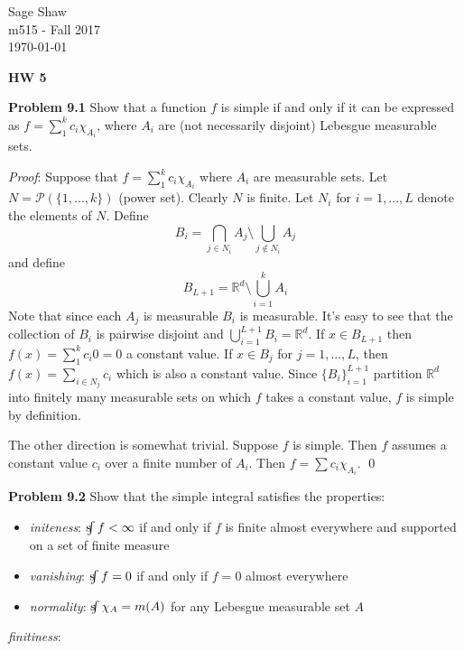 \documentclass[12pt]{article}
\newcommand{\problem}[1]{\hspace{-4 ex} \large \textbf{Problem #1} }
\newcommand{\sint}{\text{s}\kern-5pt\int}
\newcommand{\powerset}{\mathcal{P}}
\renewenvironment{proof}{\hspace{-4 ex} \emph{Proof}:}{\qed}
\begin{document}
	\thispagestyle{empty}
	
	\begin{flushright}
		Sage Shaw \\
		m515 - Fall 2017 \\
		\today
	\end{flushright}
	
{\large \textbf{HW 5}}\bigbreak

\problem{9.1} Show that a function $f$ is simple if and only if it can be expressed as $f=\sum_1^kc_i\chi_{A_i}$, where $A_i$ are (not necessarily disjoint) Lebesgue measurable sets.

	\begin{proof}
		Suppose that $f=\sum_1^kc_i\chi_{A_i}$ where $A_i$ are measurable sets.
		Let $N = \powerset (\{1,...,k\})$ (power set). Clearly $N$ is finite. Let $N_i$ for $i=1,...,L$ denote the elements of $N$. Define
		$$
		B_i = \bigcap_{j \in N_i}A_j \setminus \bigcup_{j \notin N_i}A_j
		$$
		and define
		$$
		B_{L+1} = \mathbb{R}^d \setminus \bigcup_{i=1}^k A_i
		$$
		Note that since each $A_j$ is measurable $B_i$ is measurable. It's easy to see that the collection of $B_i$ is pairwise disjoint and $\bigcup_{i=1}^{L+1} B_i = \mathbb{R}^d$. If $x \in B_{L+1}$ then $f(x)=\sum_1^kc_i 0 = 0$ a constant value. If $x \in B_j$ for $j=1,...,L$, then $f(x) = \sum_{i \in N_j}c_i$ which is also a constant value. Since $\{B_i\}_{i=1}^{L+1}$ partition $\mathbb{R}^d$ into finitely many measurable sets on which $f$ takes a constant value, $f$ is simple by definition. \bigbreak
		
		The other direction is somewhat trivial. Suppose $f$ is simple. Then $f$ assumes a constant value $c_i$ over a finite number of $A_i$. Then $f = \sum c_i \chi_{A_i}$.
	\end{proof}

\problem{9.2} Show that the simple integral satisfies the properties:
	\begin{itemize}
		\item \emph{initeness}: $\sint f<\infty$ if and only if $f$ is finite almost everywhere and supported on a set of finite measure
		\item \emph{vanishing}: $\sint f=0$ if and only if $f=0$ almost everywhere
		\item \emph{normality}: $\sint\chi_A=m(A)$ for any Lebesgue measurable set $A$
	\end{itemize}

	\hspace{-3 ex}\emph{finitiness}:
	
\end{document}
